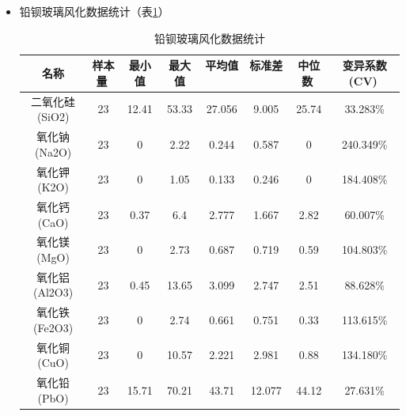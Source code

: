 \documentclass{my_paper}
\begin{document}
\begin{enumerate}
\begin{itemize}
    \item 铅钡玻璃风化数据统计（表\ref{index4}）
    \begin{longtable}{cccccccc}
    \caption{铅钡玻璃风化数据统计}
    \label{index4} \\
    \toprule
    名称                   & 样本量                 & 最小值                  & 最大值                  & 平均值                 & 标准差                 & 中位数                 & 变异系数(CV)            \\
    \midrule
    二氧化硅(SiO2)           & 23                   & 12.41                & 53.33                & 27.056               & 9.005                & 25.74                & 33.283\%             \\
    氧化钠(Na2O)            & 23                   & 0                    & 2.22                 & 0.244                & 0.587                & 0                    & 240.349\%            \\
    氧化钾(K2O)             & 23                   & 0                    & 1.05                 & 0.133                & 0.246                & 0                    & 184.408\%            \\
    氧化钙(CaO)             & 23                   & 0.37                 & 6.4                  & 2.777                & 1.667                & 2.82                 & 60.007\%             \\
    氧化镁(MgO)             & 23                   & 0                    & 2.73                 & 0.687                & 0.719                & 0.59                 & 104.803\%            \\
    氧化铝(Al2O3)           & 23                   & 0.45                 & 13.65                & 3.099                & 2.747                & 2.51                 & 88.628\%             \\
    氧化铁(Fe2O3)           & 23                   & 0                    & 2.74                 & 0.661                & 0.751                & 0.33                 & 113.615\%            \\
    氧化铜(CuO)             & 23                   & 0                    & 10.57                & 2.221                & 2.981                & 0.88                 & 134.180\%            \\
    氧化铅(PbO)             & 23                   & 15.71                & 70.21                & 43.71                & 12.077               & 44.12                & 27.631\%             \\

\end{longtable}
\end{itemize}
\end{enumerate}
\end{document}
